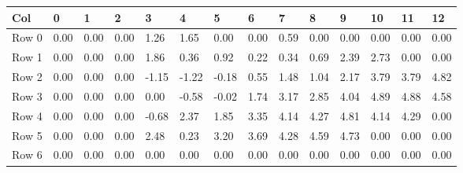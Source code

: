 \documentclass[preview]{standalone}
\begin{document}
\begin{table}[]
\begin{tabular}{|l||l||l||l||l||l||l||l||l||l||l||l||l|} 
 \hline
 Col 	 & 0 	 & 1 	 & 2 	 & 3 	 & 4 	 & 5 	 & 6 	 & 7 	 & 8 	 & 9 	 & 10 	 & 11 	 & 12 	 \\ \hline 
Row 0 	 & 0.00 	 & 0.00 	 & 0.00 	 & 1.26 	 & 1.65 	 & 0.00 	 & 0.00 	 & 0.59 	 & 0.00 	 & 0.00 	 & 0.00 	 & 0.00 	 & 0.00 	 \\ \hline 
Row 1 	 & 0.00 	 & 0.00 	 & 0.00 	 & 1.86 	 & 0.36 	 & 0.92 	 & 0.22 	 & 0.34 	 & 0.69 	 & 2.39 	 & 2.73 	 & 0.00 	 & 0.00 	 \\ \hline 
Row 2 	 & 0.00 	 & 0.00 	 & 0.00 	 & -1.15 	 & -1.22 	 & -0.18 	 & 0.55 	 & 1.48 	 & 1.04 	 & 2.17 	 & 3.79 	 & 3.79 	 & 4.82 	 \\ \hline 
Row 3 	 & 0.00 	 & 0.00 	 & 0.00 	 & 0.00 	 & -0.58 	 & -0.02 	 & 1.74 	 & 3.17 	 & 2.85 	 & 4.04 	 & 4.89 	 & 4.88 	 & 4.58 	 \\ \hline 
Row 4 	 & 0.00 	 & 0.00 	 & 0.00 	 & -0.68 	 & 2.37 	 & 1.85 	 & 3.35 	 & 4.14 	 & 4.27 	 & 4.81 	 & 4.14 	 & 4.29 	 & 0.00 	 \\ \hline 
Row 5 	 & 0.00 	 & 0.00 	 & 0.00 	 & 2.48 	 & 0.23 	 & 3.20 	 & 3.69 	 & 4.28 	 & 4.59 	 & 4.73 	 & 0.00 	 & 0.00 	 & 0.00 	 \\ \hline 
Row 6 	 & 0.00 	 & 0.00 	 & 0.00 	 & 0.00 	 & 0.00 	 & 0.00 	 & 0.00 	 & 0.00 	 & 0.00 	 & 0.00 	 & 0.00 	 & 0.00 	 & 0.00 	 \\ \hline 
\end{tabular} 
\end{table}
\end{document}
